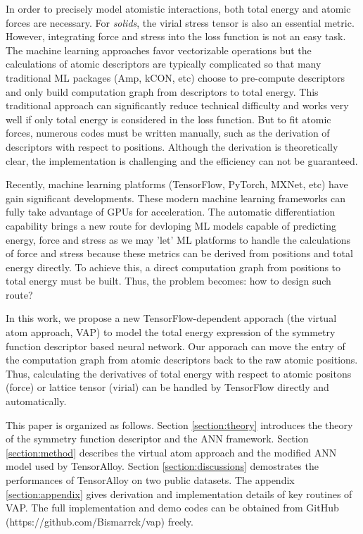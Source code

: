 \documentclass[preprint]{revtex4-2}
\begin{document}
In order to precisely model atomistic interactions, both total energy and atomic 
forces are necessary. For \textit{solids}, the virial stress tensor is also an
essential metric. However, integrating force and stress into the loss function 
is not an easy task. The machine learning approaches favor vectorizable 
operations but the calculations of atomic descriptors are typically complicated 
so that many traditional ML packages (Amp, kCON, etc) choose to pre-compute 
descriptors and only build computation graph from descriptors to total energy. 
This traditional approach can significantly reduce technical difficulty and 
works very well if only total energy is considered in the loss function. But to 
fit atomic forces, numerous codes must be written manually, such as the 
derivation of descriptors with respect to positions. Although the derivation is 
theoretically clear, the implementation is challenging and the efficiency can 
not be guaranteed.

Recently, machine learning platforms (TensorFlow\cite{tensorflow}, 
PyTorch\cite{pytorch}, MXNet\cite{MXNet}, etc) have gain significant 
developments. These modern machine learning frameworks can fully take advantage 
of GPUs for acceleration. The automatic differentiation capability brings a new 
route for devloping ML models capable of predicting energy, force and stress as 
we may 'let' ML platforms to handle the calculations of force and stress because 
these metrics can be derived from positions and total energy directly. To 
achieve this, a direct computation graph from positions to total energy must be
built. Thus, the problem becomes: how to design such route?

In this work, we propose a new TensorFlow-dependent apporach (the virtual atom 
approach, VAP) to model the total energy expression of the symmetry function 
descriptor based neural network. 
Our apporach can move the entry of the computation graph from atomic descriptors 
back to the raw atomic positions. Thus, calculating the derivatives of total 
energy with respect to atomic positons (force) or lattice tensor (virial) can be 
handled by TensorFlow directly and automatically. 

This paper is organized as follows. Section \ref{section:theory} introduces the 
theory of the symmetry function descriptor and the ANN framework. Section 
\ref{section:method} describes the virtual atom approach and the modified ANN 
model used by TensorAlloy. Section \ref{section:discussions} demostrates 
the performances of TensorAlloy on two public datasets. The appendix 
\ref{section:appendix} gives derivation and implementation details of key 
routines of VAP. The full implementation and demo codes can be obtained from 
GitHub (https://github.com/Bismarrck/vap) freely.
\end{document}

